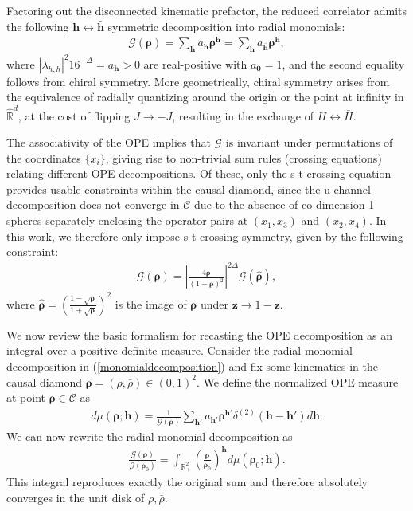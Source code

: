 \documentclass[10pt,a4paper]{amsart}
\newcommand{\De}{\Delta}
\newcommand{\ba}{\begin{equation} \begin{aligned}}
\newcommand{\bs}[1]{\boldsymbol{#1}}
\newcommand{\ea}{\end{aligned} \end{equation}}
\newcommand{\bh}{{\bar{h}}}
\begin{document}
Factoring out the disconnected kinematic prefactor, the reduced correlator admits the following $\bs{h} \leftrightarrow\bar{\bs{h}}$ symmetric decomposition into radial monomials:
\ba
\mathcal{G}(\bs{\rho}) = \sum_{\bs{h}} a_{\bs{h}} \bs{\rho}^{\bs{h}} = \sum_{\bs{h}} a_{\bar{\bs{h}}} \bs{\rho}^{\bs{h}},
\label{monomialdecomposition}
\ea
where $|\lambda_{h,\bh}|^2 16^{-\De} = a_{\bs{h}}>0$ are real-positive with $a_{\bs{0}} = 1$, and the second equality follows from chiral symmetry. More geometrically, chiral symmetry arises from the equivalence of radially quantizing around the origin or the point at infinity in $\widehat{\mathbb{R}}^d$, at the cost of flipping $J \to -J$, resulting in the exchange of $H \leftrightarrow \bar{H}$.
 
The associativity of the OPE implies that $\mathcal{G}$ is invariant under permutations of the coordinates $\{x_i\}$, giving rise to non-trivial sum rules (crossing equations) relating different OPE decompositions. Of these, only the s-t crossing equation provides usable constraints within the causal diamond, since the u-channel decomposition does not converge in $\mathscr{C}$ due to the absence of co-dimension 1 spheres separately enclosing the operator pairs at $(x_1,x_3)$ and $(x_2,x_4)$. In this work, we therefore only impose s-t crossing symmetry, given by the following constraint:
\ba
\label{stcrossing}
\mathcal{G}(\bs{\rho}) = \left|\frac{4 \bs{\rho}}{(1-\bs{\rho})^2}\right|^{2\De}\mathcal{G}(\hat{\bs{\rho}}),
\ea
where $\hat{\bs{\rho}} = \left(\frac{1-\sqrt{\bs{\rho}}}{1+\sqrt{\bs{\rho}}} \right)^2$ is the image of $\bs{\rho}$ under $\bs{z} \to 1-\bs{z}$.

We now review the basic formalism for recasting the OPE decomposition as an integral over a positive definite measure. Consider the radial monomial decomposition in (\ref{monomialdecomposition}) and fix some kinematics in the causal diamond $\boldsymbol{\rho} = (\rho,\bar{\rho})\in(0,1)^2$. We define the normalized OPE measure at point $\bs{\rho} \in \mathscr{C}$ as
\ba
d\mu(\bs{\rho}; \bs{h}) = \frac{1}{\mathcal{G}(\bs{\rho})}\sum_{\bs{h}'} a_{\bs{h}'} \bs{\rho}^{\bs{h}'} \delta^{(2)}(\bs{h} - \bs{h}') d\bs{h}.
\ea
We can now rewrite the radial monomial decomposition as 
\ba
\frac{\mathcal{G}\left(\bs{\rho}\right)}{\mathcal{G}\left(\bs{\rho}_0\right)} = \int_{\mathbb{R}^2_+} \left(\frac{\bs{\rho}}{\bs{\rho}_0}\right)^{\bs{h}} d\mu(\bs{\rho}_0 ; \bs{h}) .
\label{radmonomialdecomp}
\ea
This integral reproduces exactly the original sum and therefore absolutely converges in the unit disk of $\rho,\bar{\rho}$.
\end{document}
